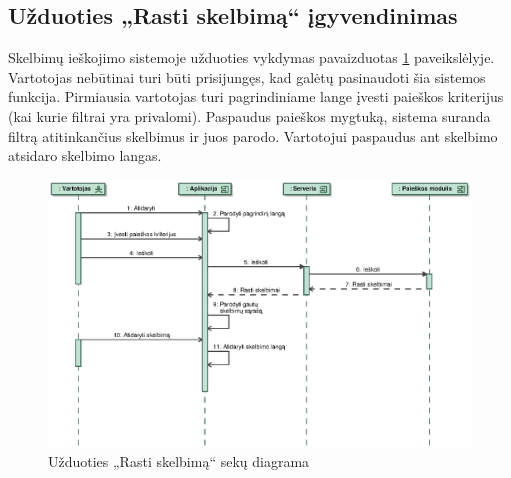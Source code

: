 \documentclass[12pt]{article}
\begin{document}
	\pagebreak
	
	\subsection{Užduoties „Rasti skelbimą“ įgyvendinimas}
	Skelbimų ieškojimo sistemoje užduoties vykdymas pavaizduotas \ref{FindAdvertSeq} paveikslėlyje. Vartotojas nebūtinai turi būti prisijungęs, kad galėtų pasinaudoti šia sistemos funkcija. Pirmiausia vartotojas turi pagrindiniame lange įvesti paieškos kriterijus (kai kurie filtrai yra privalomi). Paspaudus paieškos mygtuką, sistema suranda filtrą atitinkančius skelbimus ir juos parodo. Vartotojui paspaudus ant skelbimo atsidaro skelbimo langas.
	\begin{figure}[h]
		\begin{center}
			\includegraphics[width=\textwidth]{RastiSkelbima.eps}
			\caption{Užduoties „Rasti skelbimą“ sekų diagrama\label{FindAdvertSeq}}
		\end{center}
	\end{figure}
	
	
	\pagebreak
	
\end{document}
